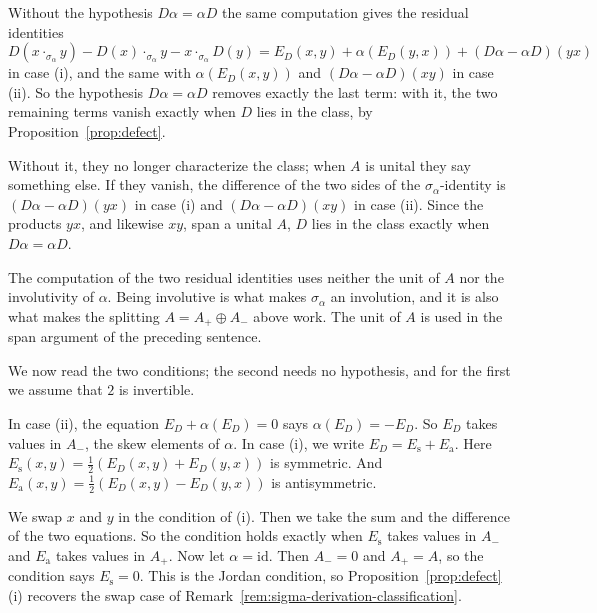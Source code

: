 \documentclass[]{interact}
\theoremstyle{plain}
\theoremstyle{definition}
\theoremstyle{remark}
\begin{document}
Without the hypothesis $D\alpha = \alpha D$ the same computation gives the residual identities
\[
D(x \cdot_{\sigma_\alpha} y) - D(x) \cdot_{\sigma_\alpha} y - x \cdot_{\sigma_\alpha} D(y)
= E_D(x,y) + \alpha(E_D(y,x)) + (D\alpha - \alpha D)(yx)
\]
in case (i), and the same with $\alpha(E_D(x,y))$ and $(D\alpha - \alpha D)(xy)$ in case (ii).
So the hypothesis $D\alpha = \alpha D$ removes exactly the last term: with it, the two remaining terms vanish exactly when $D$ lies in the class, by Proposition~\ref{prop:defect}.

Without it, they no longer characterize the class; when $A$ is unital they say something else. %
If they vanish, the difference of the two sides of the $\sigma_\alpha$-identity is $(D\alpha - \alpha D)(yx)$ in case (i) and $(D\alpha - \alpha D)(xy)$ in case (ii).
Since the products $yx$, and likewise $xy$, span a unital $A$, $D$ lies in the class exactly when $D\alpha = \alpha D$.

The computation of the two residual identities uses neither the unit of $A$ nor the involutivity of $\alpha$. Being involutive is what makes $\sigma_\alpha$ an involution, and it is also what makes the splitting $A = A_+ \oplus A_-$ above work. The unit of $A$ is used in the span argument of the preceding sentence. %

We now read the two conditions; the second needs no hypothesis, and for the first we assume that $2$ is invertible.

In case (ii), the equation $E_D + \alpha(E_D) = 0$ says $\alpha(E_D) = -E_D$.
So $E_D$ takes values in $A_-$, the skew elements of $\alpha$.
In case (i), we write $E_D = E_{\mathrm{s}} + E_{\mathrm{a}}$.
Here $E_{\mathrm{s}}(x,y) = \tfrac12(E_D(x,y) + E_D(y,x))$ is symmetric.
And $E_{\mathrm{a}}(x,y) = \tfrac12(E_D(x,y) - E_D(y,x))$ is antisymmetric.

We swap $x$ and $y$ in the condition of (i).
Then we take the sum and the difference of the two equations.
So the condition holds exactly when $E_{\mathrm{s}}$ takes values in $A_-$ and $E_{\mathrm{a}}$ takes values in $A_+$.
Now let $\alpha = \mathrm{id}$.
Then $A_- = 0$ and $A_+ = A$, so the condition says $E_{\mathrm{s}} = 0$.
This is the Jordan condition, so Proposition~\ref{prop:defect}(i) recovers the swap case of Remark~\ref{rem:sigma-derivation-classification}.
\end{document}
